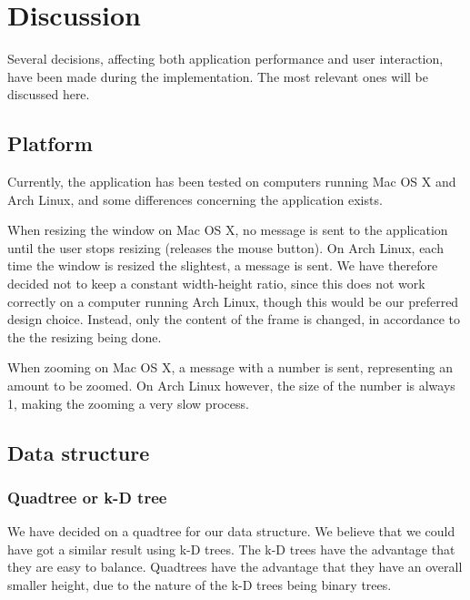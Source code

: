 \documentclass[a4paper,11pt]{article}
\begin{document}
\pagebreak
\section{Discussion} %
\label{sec:Discussion} %
Several decisions, affecting both application performance and user interaction, have been made during the implementation. The most relevant ones will be discussed here.

\subsection{Platform} %
Currently, the application has been tested on computers running Mac OS X and Arch Linux, and some differences concerning the application exists.

When resizing the window on Mac OS X, no message is sent to the application until the user stops resizing (releases the mouse button). On Arch Linux, each time the window is resized the slightest, a message is sent. We have therefore decided not to keep a constant width-height ratio, since this does not work correctly on a computer running Arch Linux, though this would be our preferred design choice. Instead, only the content of the frame is changed, in accordance to the the resizing being done.

When zooming on Mac OS X, a message with a number is sent, representing an amount to be zoomed. On Arch Linux however, the size of the number is always 1, making the zooming a very slow process.

\subsection{Data structure} %

\subsubsection{Quadtree or k-D tree} %
We have decided on a quadtree for our data structure. We believe that we could have got a similar result using k-D trees. The k-D trees have the advantage that they are easy to balance. Quadtrees have the advantage that they have an overall smaller height, due to the nature of the k-D trees being binary trees.
\end{document}
